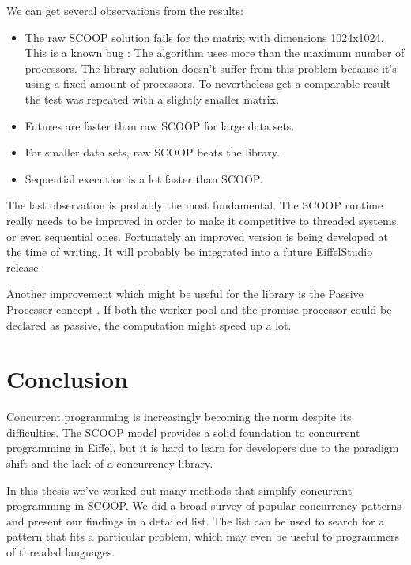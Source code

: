 \documentclass[a4paper,10pt,titlepage]{article}
\begin{document}
We can get several observations from the results:

\begin{itemize}
 \item The raw SCOOP solution fails for the matrix with dimensions 1024x1024.
 This is a known bug \cite{web:scoop-issues}:
 The algorithm uses more than the maximum number of processors.
 The library solution doesn't suffer from this problem because it's using a fixed amount of processors.
 To nevertheless get a comparable result the test was repeated with a slightly smaller matrix.
 \item Futures are faster than raw SCOOP for large data sets.
 \item For smaller data sets, raw SCOOP beats the library.
 \item Sequential execution is a lot faster than SCOOP.
\end{itemize}

The last observation is probably the most fundamental.
The SCOOP runtime really needs to be improved in order to make it competitive to threaded systems, or even sequential ones.
Fortunately an improved version \cite{thesis:scottwest} is being developed at the time of writing.
It will probably be integrated into a future EiffelStudio release.

Another improvement which might be useful for the library is the Passive Processor concept \cite{paper:passive-processors}.
If both the worker pool and the promise processor could be declared as passive, the computation might speed up a lot.

\section{Conclusion}

Concurrent programming is increasingly becoming the norm despite its difficulties.
The SCOOP model provides a solid foundation to concurrent programming in Eiffel, 
but it is hard to learn for developers due to the paradigm shift and the lack of a concurrency library.

In this thesis we've worked out many methods that simplify concurrent programming in SCOOP.
We did a broad survey of popular concurrency patterns and present our findings in a detailed list.
The list can be used to search for a pattern that fits a particular problem, which may even be useful to programmers of threaded languages.
\end{document}
